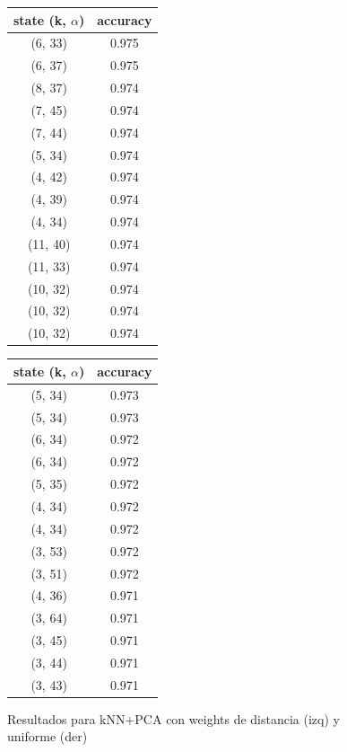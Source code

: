 \documentclass[a4paper]{article}
\begin{document}
    
    \begin{figure}[H]
        \centering
        \begin{tabular}{ |c|c| } 
        \hline
        \textbf{state} (k, $\alpha$)  & \textbf{accuracy}   \\
        \hline
        (6, 33)&  0.975 \\
        (6, 37)&  0.975 \\
        (8, 37)&  0.974 \\
        (7, 45)&  0.974 \\
        (7, 44)&  0.974 \\
        (5, 34)&  0.974 \\
        (4, 42)&  0.974 \\
        (4, 39)&  0.974 \\
        (4, 34)&  0.974 \\
        (11, 40)& 0.974 \\
        (11, 33)& 0.974 \\
        (10, 32)& 0.974 \\
        (10, 32)& 0.974 \\
        (10, 32)& 0.974 \\
        \hline
        \end{tabular}
        \quad
        \begin{tabular}{ |c|c| } 
        \hline
        \textbf{state} (k, $\alpha$)  & \textbf{accuracy}   \\
        \hline
        (5, 34) & 0.973 \\
        (5, 34) & 0.973 \\
        (6, 34) & 0.972 \\
        (6, 34) & 0.972 \\
        (5, 35) & 0.972 \\
        (4, 34) & 0.972 \\
        (4, 34) & 0.972 \\
        (3, 53) & 0.972 \\
        (3, 51) & 0.972 \\
        (4, 36) & 0.971 \\
        (3, 64) & 0.971 \\
        (3, 45) & 0.971 \\
        (3, 44) & 0.971 \\
        (3, 43) & 0.971 \\
        \hline
        \end{tabular}
        \caption{Resultados para kNN+PCA con weights de distancia (izq) y uniforme (der) }
        \label{fig:knn+pca-optimization-results}
    \end{figure}
    
\end{document}

